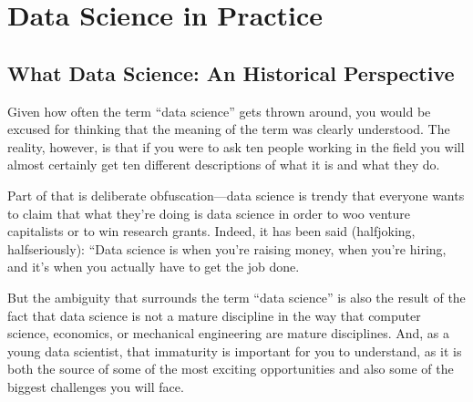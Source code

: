 \documentclass[letterpaper,10pt,english]{jupyterBook}
\begin{document}
\sphinxstepscope


\part{Data Science in Practice}

\sphinxstepscope


\chapter{What  Data Science: An Historical Perspective}
\label{\detokenize{10_introduction/40_data_science_in_historical_context:what-is-data-science-an-historical-perspective}}\label{\detokenize{10_introduction/40_data_science_in_historical_context::doc}}
\sphinxAtStartPar
Given how often the term “data science” gets thrown around, you would be excused for thinking that the meaning of the term was clearly understood. The reality, however, is that if you were to ask ten people working in the field you will almost certainly get ten different descriptions of what it is and what they do.

\sphinxAtStartPar
Part of that is deliberate obfuscation—data science is  trendy that everyone wants to claim that what they’re doing is data science in order to woo venture capitalists or to win research grants. Indeed, it has been said (half\sphinxhyphen{}joking, half\sphinxhyphen{}seriously): “Data science is  when you’re raising money,  when you’re hiring, and it’s  when you actually have to get the job done.

\sphinxAtStartPar
But the ambiguity that surrounds the term “data science” is also the result of the fact that data science is not a mature discipline in the way that computer science, economics, or mechanical engineering are mature disciplines. And, as a young data scientist, that immaturity is important for you to understand, as it is both the source of some of the most exciting opportunities and also some of the biggest challenges you will face.
\end{document}
